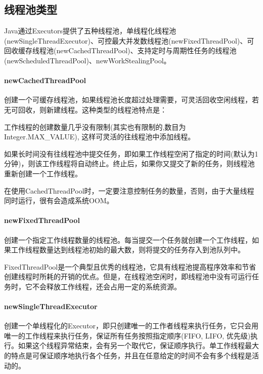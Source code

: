 \documentclass[../../../interview-questions.tex]{subfiles}
\begin{document}
\subsection{线程池类型}

Java通过Executors提供了五种线程池，单线程化线程池(newSingleThreadExecutor)、可控最大并发数线程池(newFixedThreadPool)、可回收缓存线程池(newCachedThreadPool)、支持定时与周期性任务的线程池(newScheduledThreadPool)、newWorkStealingPool。

\paragraph{newCachedThreadPool}

创建一个可缓存线程池，如果线程池长度超过处理需要，可灵活回收空闲线程，若无可回收，则新建线程。这种类型的线程池特点是：

工作线程的创建数量几乎没有限制(其实也有限制的,数目为Integer.MAX\_VALUE), 这样可灵活的往线程池中添加线程。

如果长时间没有往线程池中提交任务，即如果工作线程空闲了指定的时间(默认为1分钟)，则该工作线程将自动终止。终止后，如果你又提交了新的任务，则线程池重新创建一个工作线程。

在使用CachedThreadPool时，一定要注意控制任务的数量，否则，由于大量线程同时运行，很有会造成系统OOM。

\paragraph{newFixedThreadPool}

创建一个指定工作线程数量的线程池。每当提交一个任务就创建一个工作线程，如果工作线程数量达到线程池初始的最大数，则将提交的任务存入到池队列中。

FixedThreadPool是一个典型且优秀的线程池，它具有线程池提高程序效率和节省创建线程时所耗的开销的优点。但是，在线程池空闲时，即线程池中没有可运行任务时，它不会释放工作线程，还会占用一定的系统资源。

\paragraph{newSingleThreadExecutor}

创建一个单线程化的Executor，即只创建唯一的工作者线程来执行任务，它只会用唯一的工作线程来执行任务，保证所有任务按照指定顺序(FIFO, LIFO, 优先级)执行。如果这个线程异常结束，会有另一个取代它，保证顺序执行。单工作线程最大的特点是可保证顺序地执行各个任务，并且在任意给定的时间不会有多个线程是活动的。
\end{document}
